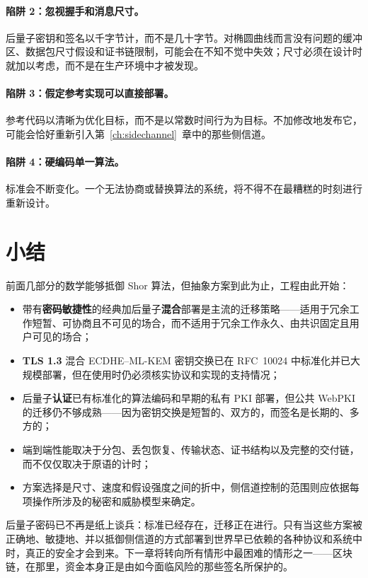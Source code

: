 \paragraph{陷阱 2：忽视握手和消息尺寸。}
后量子密钥和签名以千字节计，而不是几十字节。对椭圆曲线而言没有问题的缓冲区、数据包尺寸假设和证书链限制，可能会在不知不觉中失效；尺寸必须在设计时就加以考虑，而不是在生产环境中才被发现。

\paragraph{陷阱 3：假定参考实现可以直接部署。}
参考代码以清晰为优化目标，而不是以常数时间行为为目标。不加修改地发布它，可能会恰好重新引入第~\ref{ch:sidechannel}~章中的那些侧信道。

\paragraph{陷阱 4：硬编码单一算法。}
标准会不断变化。一个无法协商或替换算法的系统，将不得不在最糟糕的时刻进行重新设计。

\section{小结}
前面几部分的数学能够抵御 Shor 算法，但抽象方案到此为止，工程由此开始：

\begin{itemize}
  \item 带有\textbf{密码敏捷性}的经典加后量子\textbf{混合}部署是主流的迁移策略——适用于冗余工作短暂、可协商且不可见的场合，而不适用于冗余工作永久、由共识固定且用户可见的场合；
  \item \textbf{TLS 1.3} 混合 ECDHE--ML-KEM 密钥交换已在 RFC~10024 中标准化并已大规模部署，但在使用时仍必须核实协议和实现的支持情况；
  \item 后量子\textbf{认证}已有标准化的算法编码和早期的私有 PKI 部署，但公共 WebPKI 的迁移仍不够成熟——因为密钥交换是短暂的、双方的，而签名是长期的、多方的；
  \item 端到端性能取决于分包、丢包恢复、传输状态、证书结构以及完整的交付链，而不仅仅取决于原语的计时；
  \item 方案选择是尺寸、速度和假设强度之间的折中，侧信道控制的范围则应依据每项操作所涉及的秘密和威胁模型来确定。
\end{itemize}

后量子密码已不再是纸上谈兵：标准已经存在，迁移正在进行。只有当这些方案被正确地、敏捷地、并以抵御侧信道的方式部署到世界早已依赖的各种协议和系统中时，真正的安全才会到来。下一章将转向所有情形中最困难的情形之一——区块链，在那里，资金本身正是由如今面临风险的那些签名所保护的。

\printbibliography[heading=chapterrefs]
